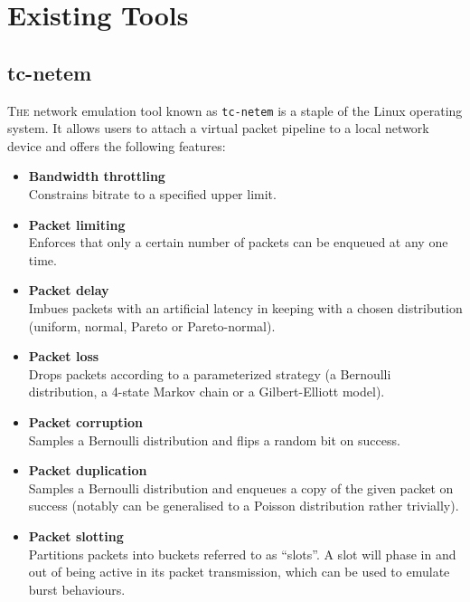 \section{Existing Tools}

\subsection{tc-netem}

\lettrine{T}{he} network emulation tool known as \texttt{tc-netem} is a staple of the Linux operating
system\cite{tc_netem_wiki, tc_netem_8_man,tc_netem_src}. It allows users to attach a virtual packet pipeline to a
local network device and offers the following features:
\begin{itemize}
    \item \textbf{Bandwidth throttling} \\
    Constrains bitrate to a specified upper limit.
    \item \textbf{Packet limiting} \\
    Enforces that only a certain number of packets can be enqueued at any one time.
    \item \textbf{Packet delay} \\
    Imbues packets with an artificial latency in keeping with a chosen distribution (uniform, normal, Pareto or
    Pareto-normal).
    \item \textbf{Packet loss} \\
    Drops packets according to a parameterized strategy (a Bernoulli distribution, a 4-state Markov chain or a
    Gilbert-Elliott model\cite{ge_model}).
    \item \textbf{Packet corruption} \\
    Samples a Bernoulli distribution and flips a random bit on success.
    \item \textbf{Packet duplication} \\
    Samples a Bernoulli distribution and enqueues a copy of the given packet on success (notably can be generalised to a
    Poisson distribution rather trivially).
    \item \textbf{Packet slotting} \\
    Partitions packets into buckets referred to as ``slots''. A slot will phase in and out of being active in its
    packet transmission, which can be used to emulate burst behaviours.
\end{itemize}

